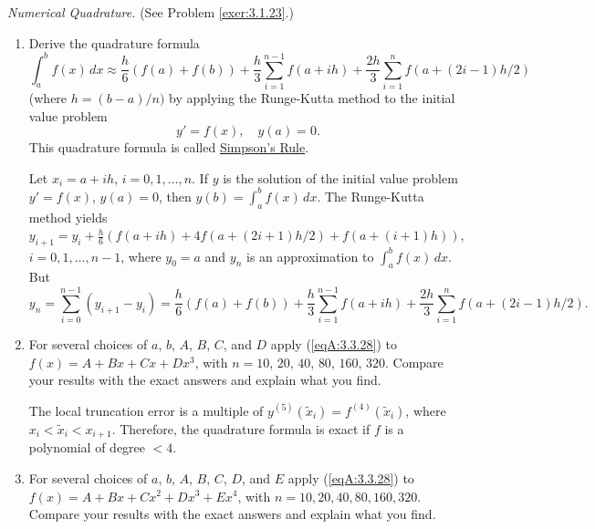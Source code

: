 \documentclass{ximera}
\begin{document}
\begin{problem}\label{exer:3.3.28}
\emph{Numerical Quadrature.} (See
Problem \ref{exer:3.1.23}.)
\begin{enumerate}
\item %
Derive the quadrature formula
\begin{equation}\label{eqA:3.3.28}
\int_a^bf(x)\,dx\approx \frac{h}{6}(f(a)+f(b))+
\frac{h}{3}\sum_{i=1}^{n-1}f(a+ih)+\frac{2h}{3}\sum_{i=1}^n
f\left(a+(2i-1)h/2\right)
\end{equation}
(where $h=(b-a)/n)$
by applying the Runge-Kutta  method to the initial value problem
$$
y'=f(x),\quad y(a)=0.
$$
This quadrature formula is  called
\href{http://www-history.mcs.st-and.ac.uk/Mathematicians/Simpson.html}
{Simpson's Rule}.

\begin{solution}
    Let $x_i=a+ih$, $i=0,1,\dots,n$. If $y$ is the solution of the initial
value problem $y'=f(x)$, $y(a)=0$, then $y(b)=\int_a^bf(x)\,dx$.
The Runge-Kutta method yields
$y_{i+1}=
y_i+\frac{h}{6}\left(f(a+ih)+4f(a+(2i+1)h/2)+f(a+(i+1)h)\right)$,
$i=0,1,\dots,n-1$,
where $y_0=a$ and $y_n$ is an approximation to $\int_a^bf(x)\,dx$.
But
$$
y_n=\sum_{i=0}^{n-1}(y_{i+1}-y_i) =
\frac{h}{6}(f(a)+f(b))+
\frac{h}{3}\sum_{i=1}^{n-1}f(a+ih)+\frac{2h}{3}\sum_{i=1}^n
f\left(a+(2i-1)h/2\right).
$$
\end{solution}
\item %
For several choices of $a$, $b$, $A$, $B$, $C$, and $D$
 apply (\ref{eqA:3.3.28}) to $f(x)=A+Bx+Cx+Dx^3$, with $n = 10$, $20$, $40$, $80$, $160$, $320$.
Compare your results with the exact answers
and explain what you find.

\begin{solution}
    The local truncation error is a multiple of
$y^{(5)}(\tilde x_i)=f^{(4)}(\tilde x_i)$, where $x_i<\tilde
x_i<x_{i+1}$. Therefore, the quadrature formula is exact
if $f$ is a polynomial of degree $<4$.
\end{solution}

\item %
For several choices of $a$, $b$, $A$, $B$, $C$, $D$, and $E$
 apply (\ref{eqA:3.3.28}) to $f(x)=A+Bx+Cx^2+Dx^3+Ex^4$, with
$n=10,20,40,80,160,320$.
 Compare your results with the exact answers
and explain what you find.


\end{enumerate}
\end{problem}
\end{document}
